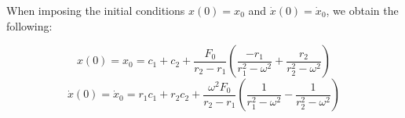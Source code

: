 When imposing the initial conditions $x(0) = x_0$ and $\dot{x}(0) = \dot{x}_0$, we obtain the following:

\begin{equation}
	\label{eq_rvw_x}
	x(0) = x_0 =  c_1  + c_2 +  \frac{F_0}{r_2 - r_1} \left(  \frac{-r_1}{r_1^2 - \omega^2} +  \frac{r_2}{r_2^2 - \omega^2}   \right)
\end{equation}
\begin{equation}
	\label{eq_rvw_dx}
	\dot{x}(0) = \dot{x}_0 = r_1 c_1 + r_2 c_2 +  \frac{\omega^2 F_0 }{r_2 - r_1} \left( \frac{1}{r_1^2 - \omega^2}  -  \frac{1}{r_2^2 - \omega^2} \right)
\end{equation}



